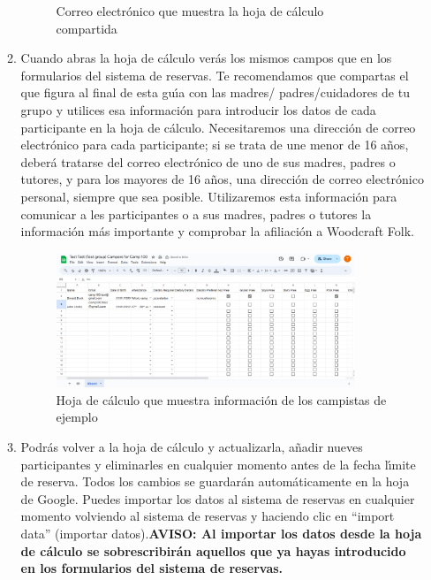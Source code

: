\documentclass[a4paper, 11pt]{report}
\begin{document}
\begin{enumerate}
\begin{enumerate}
\begin{figure}[H]
            \caption{Correo electr\'onico que muestra la hoja de c\'alculo compartida}
        \end{figure}
        \item Cuando abras la hoja de c\'alculo ver\'as los mismos campos que en los formularios del sistema de reservas. Te recomendamos que compartas el   que figura al final de esta gu\'{\i}a con las madres/ padres/cuidadores de tu grupo y utilices esa informaci\'on para introducir los datos de cada participante en la hoja de c\'alculo. Necesitaremos una direcci\'on de correo electr\'onico para cada participante; si se trata de une menor de 16 a\~nos, deber\'a tratarse del correo electr\'onico de uno de sus madres, padres o tutores, y para los mayores de 16 a\~nos, una direcci\'on de correo electr\'onico personal, siempre que sea posible. Utilizaremos esta informaci\'on para comunicar a les participantes o a sus madres, padres o tutores la informaci\'on m\'as importante y comprobar la afiliaci\'on a Woodcraft Folk.
        \begin{figure}[H]
            \centering
            \includegraphics[width=0.9\textwidth]{assets/2-spreadsheet.png}
            \caption{Hoja de c\'alculo que muestra informaci\'on de los campistas de ejemplo}
        \end{figure}
        \item Podr\'as volver a la hoja de c\'alculo y actualizarla, a\~nadir nueves participantes y eliminarles en cualquier momento antes de la fecha l\'{\i}mite de reserva. Todos los cambios se guardar\'an autom\'aticamente en la hoja de Google. Puedes importar los datos al sistema de reservas en cualquier momento volviendo al sistema de reservas y haciendo clic en ``import data'' (importar datos).\textbf{AVISO: Al importar los datos desde la hoja de c\'alculo se sobrescribir\'an aquellos que ya hayas introducido en los formularios del sistema de reservas. }
        \begin{figure}[H]

\end{figure}
\end{enumerate}
\end{enumerate}
\end{document}
